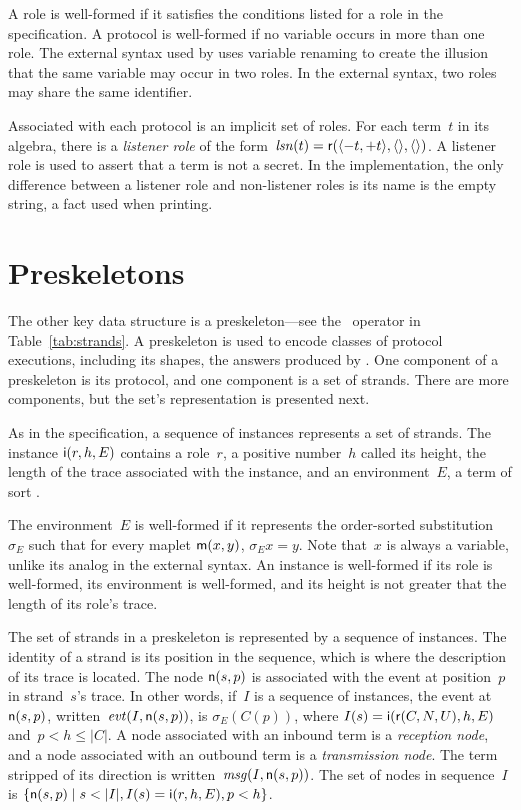 \documentclass[12pt]{report}
\theoremstyle{definition}
\begin{document}
A role is well-formed if it satisfies the
conditions listed for a role in the specification.  A protocol is
well-formed if no variable occurs in more than one role.  The external
syntax used by {\cpsa} uses variable renaming to create the illusion
that the same variable may occur in two roles.  In the external
syntax, two roles may share the same identifier.

Associated with each protocol is an implicit set of roles.  For each
term~$t$ in its algebra, there is a \label{def:listener
  role}\emph{listener role}
of the form~$\operatorname{\mathit{lsn}}(t) = \operatorname{\mathsf{r}}(\langle\mathord - t,\mathord + t\rangle, \langle\rangle,
\langle\rangle)$.  A listener role is used to assert that a term is not a
secret.  In the implementation, the only difference between a listener
role and non-listener roles is its name is the empty string, a fact
used when printing.

\section{Preskeletons}

The other key {\cpsa} data structure is a preskeleton---see the~
operator in Table~\ref{tab:strands}.  A preskeleton is used to encode
classes of protocol executions, including its shapes, the answers
produced by {\cpsa}.  One component of a preskeleton is its protocol,
and one component is a set of strands.  There are more components, but
the set's representation is presented next.

As in the specification, a sequence of instances represents a set of
strands.  The instance $\operatorname{\mathsf{i}}(r,h,E)$ contains a
role~$r$, a positive number~$h$ called its height, the length of the
trace associated with the instance, and an
environment~$E$, a term of sort 
.

The environment~$E$ is well-formed if it represents the order-sorted
substitution~$\sigma_E$ such that for every maplet $\operatorname{\mathsf{m}}(x,y)$,
$\sigma_E x=y$.  Note that~$x$ is always a variable, unlike its analog
in the external syntax.  An instance is well-formed if its role is
well-formed, its environment is well-formed, and its height is not
greater that the length of its role's trace.

The set of strands in a preskeleton is represented by a sequence of
instances.  The identity of a strand is its position in
the sequence, which is where the description of its trace is located.
The node $\operatorname{\mathsf{n}}(s,p)$ is associated with the event
at position~$p$ in strand~$s$'s trace.  In other words, if~$I$ is
a sequence of instances, the event at $\operatorname{\mathsf{n}}(s,p)$,
\label{def:evt}written~$\operatorname{\mathit{evt}}(I,\operatorname{\mathsf{n}}(s,p))$, is $\sigma_E(C(p))$, where
$I(s)=\operatorname{\mathsf{i}}(\operatorname{\mathsf{r}}(C,N,U),h,E)$ and~$p<h\leq|C|$.  A node
associated with an inbound term is a \emph{reception node}, and a node associated with an outbound
term is a \emph{transmission node}.  The term
stripped of its direction is written~$\operatorname{\mathit{msg}}(I,\operatorname{\mathsf{n}}(s,p))$.  The
set of nodes in sequence~$I$ is $\{\cn{n}(s,p) \mid s<|I|,
I(s)=\cn{i}(r,h,E), p < h\}$.
\end{document}
